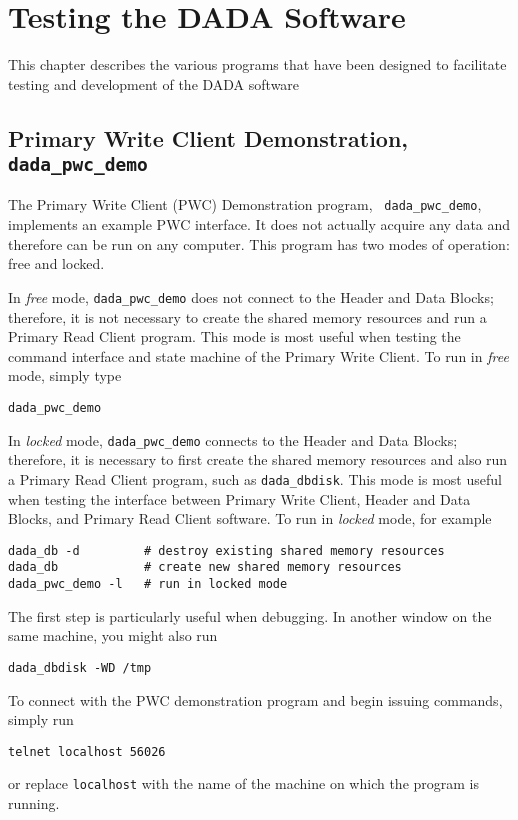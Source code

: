 \chapter{Testing the DADA Software}
\label{app:software}

This chapter describes the various programs that have been designed to
facilitate testing and development of the DADA software

\section{Primary Write Client Demonstration, {\tt dada\_pwc\_demo}}

The Primary Write Client (PWC) Demonstration program, {\tt
dada\_pwc\_demo}, implements an example PWC interface.  It does not
actually acquire any data and therefore can be run on any computer.
This program has two modes of operation: free and locked.

In {\em free} mode, {\tt dada\_pwc\_demo} does not connect to the
Header and Data Blocks; therefore, it is not necessary to create the
shared memory resources and run a Primary Read Client program.  This
mode is most useful when testing the command interface and state
machine of the Primary Write Client.  To run in {\em free} mode,
simply type
\begin{verbatim}
dada_pwc_demo
\end{verbatim}

In {\em locked} mode, {\tt dada\_pwc\_demo} connects to the Header and
Data Blocks; therefore, it is necessary to first create the shared
memory resources and also run a Primary Read Client program, such as
{\tt dada\_dbdisk}.  This mode is most useful when testing the
interface between Primary Write Client, Header and Data Blocks, and
Primary Read Client software.  To run in {\em locked} mode, for
example
\begin{verbatim}
dada_db -d         # destroy existing shared memory resources
dada_db            # create new shared memory resources
dada_pwc_demo -l   # run in locked mode
\end{verbatim}
The first step is particularly useful when debugging.
In another window on the same machine, you might also run
\begin{verbatim}
dada_dbdisk -WD /tmp
\end{verbatim}

To connect with the PWC demonstration program and begin issuing
commands, simply run
\begin{verbatim}
telnet localhost 56026
\end{verbatim}
or replace {\tt localhost} with the name of the machine on which the
program is running.


